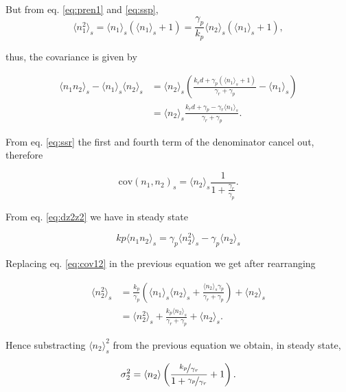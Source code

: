But from eq. \ref{eq:pren1} and \ref{eq:ssp},
\begin{equation}
\langle n_1^2 \rangle_s = \langle n_1 \rangle_s\left( \langle n_1 \rangle_s+1\right) = \frac{\gamma_p}{k_p}\langle n_2 \rangle_s\left(\langle n_1\rangle_s + 1\right),
\end{equation}

thus, the covariance is given by

\begin{align*}
\langle n_1n_2 \rangle_s - \langle n_1 \rangle_s\langle n_2\rangle_s &= \langle n_2 \rangle_s \left(\frac{k_rd+\gamma_p\left(\langle n_1\rangle_s+1\right)}{\gamma_r+\gamma_p}-\langle n_1\rangle_s\right)\\
&=\langle n_2\rangle_s\frac{k_rd+\gamma_p-\gamma_r\langle n_1\rangle_s}{\gamma_r+\gamma_p}.
\end{align*}

From eq. \ref{eq:ssr} the first and fourth term of the denominator cancel out, therefore

\begin{equation}
\label{eq:cov12}
\boxed{\text{cov}(n_1,n_2)_s = \langle n_2 \rangle_s\frac{1}{1+\frac{\gamma_r}{\gamma_p}}}.
\end{equation}

From eq. \ref{eq:dz2z2} we have in steady state

\begin{equation*}
kp\langle n_1n_2\rangle_s = \gamma_p\langle n_2^2\rangle_s-\gamma_p\langle n_2\rangle_s
\end{equation*}

Replacing eq. \ref{eq:cov12} in the previous equation we get after rearranging

\begin{align*}
\langle n_2^2\rangle_s &= \frac{k_p}{\gamma_p}\left(\langle n_1 \rangle_s\langle n_2\rangle_s + \frac{\langle n_2\rangle_s\gamma_p}{\gamma_r+\gamma_p}\right) + \langle n_2 \rangle_s\\
&=\langle n_2^2\rangle_s+\frac{k_p\langle n_2\rangle_s}{\gamma_r+\gamma_p}+\langle n_2 \rangle_s.
\end{align*}

Hence substracting $\langle n_2\rangle_s^2$ from the previous equation we obtain, in steady state,

\begin{equation}
\sigma_2^2 = \langle n_2\rangle\left(\frac{\nicefrac{k_p}{\gamma_r}}{1+\nicefrac{\gamma_p}{\gamma_r}}+1\right).
\end{equation}

